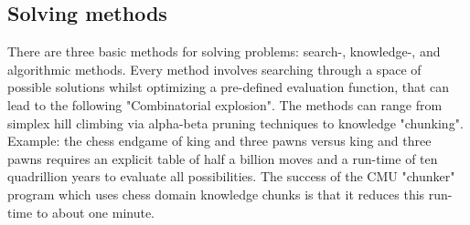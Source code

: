 \subsection{Solving methods}
There are three basic methods for solving problems: search-, knowledge-, and algorithmic methods. Every method involves searching through a space of possible solutions whilst optimizing a pre-defined evaluation function, that can lead to the following "Combinatorial explosion". The methods can range from simplex hill climbing via alpha-beta pruning techniques to knowledge "chunking". 
Example: the chess endgame of king and three pawns versus king and three pawns requires an explicit table of half a billion moves and a run-time of ten quadrillion years to evaluate all possibilities. The success of the CMU "chunker" program which uses chess domain knowledge chunks is that it reduces this run-time to about one minute.

